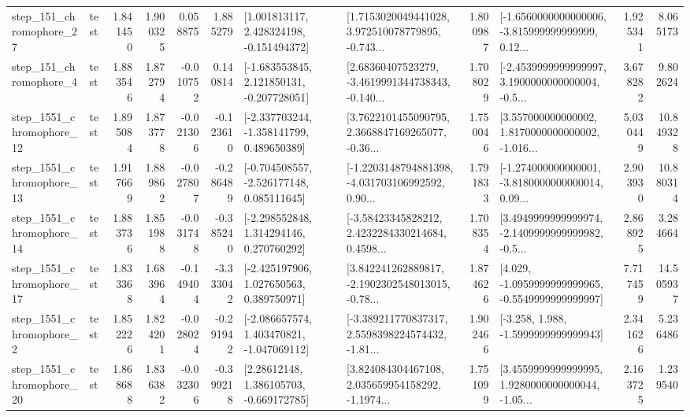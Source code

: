 \begin{tabular}{llrrrrllrlrr}
  step\_151\_chromophore\_27 &      test &      1.841450 &    1.900325 &      0.058875 &  1.885279 &    [1.001813117, 2.428324198, -0.151494372] &  [1.7153020049441028, 3.972510078779895, -0.743... &       1.800987 &  [-1.6560000000000006, -3.815999999999999, 0.12... &            1.925341 &          8.065173 \\
   step\_151\_chromophore\_4 &      test &      1.883546 &    1.872794 &     -0.010752 &  0.140814 &   [-1.683553845, 2.121850131, -0.207728051] &  [2.68360407523279, -3.4619991344738343, -0.140... &       1.708029 &  [-2.4539999999999997, 3.1900000000000004, -0.5... &            3.678282 &          9.802624 \\
 step\_1551\_chromophore\_12 &      test &      1.895084 &    1.873778 &     -0.021306 & -0.123610 &   [-2.337703244, -1.358141799, 0.489650389] &  [3.7622101455090795, 2.3668847169265077, -0.36... &       1.750046 &  [3.557000000000002, 1.8170000000000002, -1.016... &            5.030449 &         10.849328 \\
 step\_1551\_chromophore\_13 &      test &      1.917669 &    1.889862 &     -0.027807 & -0.286489 &   [-0.704508557, -2.526177148, 0.085111645] &  [-1.2203148794881398, -4.031703106992592, 0.90... &       1.791833 &  [-1.274000000000001, -3.8180000000000014, 0.09... &            2.903930 &         10.880314 \\
 step\_1551\_chromophore\_14 &      test &      1.883736 &    1.851988 &     -0.031748 & -0.385240 &    [-2.298552848, 1.314294146, 0.270760292] &  [-3.58423345828212, 2.4232284330214684, 0.4598... &       1.708354 &  [3.4949999999999974, -2.1409999999999982, -0.5... &            2.868925 &          3.284664 \\
 step\_1551\_chromophore\_17 &      test &      1.833368 &    1.683964 &     -0.149404 & -3.333042 &    [-2.425197906, 1.027650563, 0.389750971] &  [3.842241262889817, -2.1902302548013015, -0.78... &       1.874626 &  [4.029, -1.0959999999999965, -0.5549999999999997] &            7.717459 &         14.505937 \\
  step\_1551\_chromophore\_2 &      test &      1.852226 &    1.824201 &     -0.028024 & -0.291942 &   [-2.086657574, 1.403470821, -1.047069112] &  [-3.389211770837317, 2.5598398224574432, -1.81... &       1.902466 &               [-3.258, 1.988, -1.5999999999999943] &            2.341626 &          5.236486 \\
 step\_1551\_chromophore\_20 &      test &      1.868688 &    1.836382 &     -0.032306 & -0.399218 &     [2.28612148, 1.386105703, -0.669172785] &  [3.824084304467108, 2.035659954158292, -1.1974... &       1.751099 &  [3.4559999999999995, 1.9280000000000044, -1.05... &            2.163725 &          1.239540 \\

\end{tabular}
